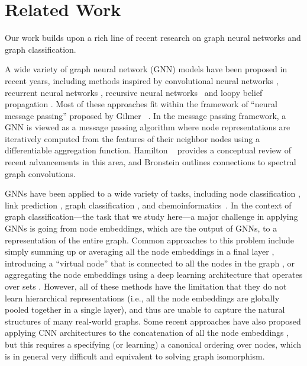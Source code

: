 \section{Related Work}

Our work builds upon a rich line of recent research on graph neural networks and graph classification. 

A wide variety of graph neural network (GNN) models have been proposed in recent years, including methods inspired by convolutional neural networks \cite{Bru+2014,Def+2015,Duv+2015,hamilton2017inductive,kipf2017semi,Lei+2017,niepert2016learning, Vel+2018}, recurrent neural networks \cite{Li+2016}, recursive neural networks~\cite{bianchini2001,Sca+2009} and loopy belief propagation \cite{dai2016discriminative}. 
Most of these approaches fit within the framework of ``neural message passing'' proposed by Gilmer \etal~\cite{Gil+2017}. 
In the message passing framework, a GNN is viewed as a message passing algorithm where node representations are iteratively computed from the features of their neighbor nodes using a differentiable aggregation function.
Hamilton \etal~\cite{Ham+2017a} provides a conceptual review of recent advancements in this area, and Bronstein \etal \cite{bronstein2017geometric} outlines connections to spectral graph convolutions. 

GNNs have been applied to a wide variety of tasks, including node classification \cite{hamilton2017inductive,kipf2017semi}, link prediction \cite{kipf2018}, graph classification \cite{dai2016discriminative,Duv+2015,zhang2018end}, and chemoinformatics~\cite{Mer+2005,Lus+2013,Fou+2017,Jin+2018,Sch+2017}. 
In the context of graph classification---the task that we study here---a major challenge in applying GNNs is going from node embeddings, which are the output of GNNs, to a representation of the entire graph. 
Common approaches to this problem include simply summing up or averaging all the node embeddings in a final layer \cite{Duv+2015}, introducing a ``virtual node'' that is connected to all the nodes in the graph \cite{Li+2016}, or aggregating the node embeddings using a deep learning architecture that operates over sets \cite{Gil+2017}.
However, all of these methods have the limitation that they do not learn hierarchical representations (i.e., all the node embeddings are globally pooled together in a single layer), and thus are unable to capture the natural structures of many real-world graphs.
Some recent approaches have also proposed applying CNN architectures to the concatenation of all the node embeddings \cite{niepert2016learning,zhang2018end}, but this requires a specifying (or learning) a canonical ordering over nodes, which is in general very difficult and equivalent to solving graph isomorphism. 

